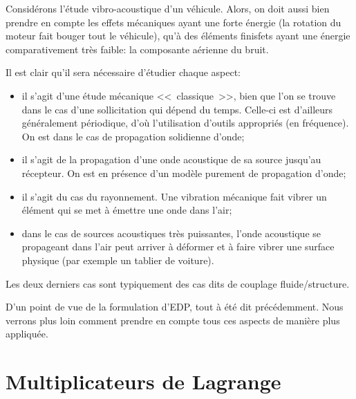 Considérons l'étude vibro-acoustique d'un véhicule.
Alors, on doit aussi bien prendre en compte les effets mécaniques ayant une forte
énergie (la rotation du moteur fait bouger tout le véhicule), qu'à des éléments finisfets ayant
une énergie comparativement très faible: la composante aérienne du bruit.

\medskip
Il est clair qu'il sera nécessaire d'étudier chaque aspect:
\begin{itemize}
\item {} il s'agit d'une étude mécanique <<~classique~>>, bien que l'on se trouve
	dans le cas d'une sollicitation qui dépend du temps. Celle-ci est d'ailleurs généralement
	périodique, d'où l'utilisation d'outils appropriés (en fréquence). On est dans
	le cas de propagation solidienne d'onde;
  \item {} il s'agit de la propagation d'une onde acoustique de sa source
	jusqu'au récepteur. On est en présence d'un modèle purement de propagation
	d'onde;
  \item {} il s'agit du cas du rayonnement. Une vibration mécanique fait
	vibrer un élément qui se met à émettre une onde dans l'air;
  \item {} dans le cas de sources acoustiques très puissantes, l'onde
	acoustique se propageant dans l'air peut arriver à déformer et à faire 
	vibrer une surface physique (par exemple un tablier de voiture).
\end{itemize}
Les deux derniers cas sont typiquement des cas dits de couplage fluide/structure.

\medskip
D'un point de vue de la formulation d'EDP, tout à été dit précédemment.
Nous verrons plus loin comment prendre en compte tous ces aspects de manière
plus appliquée.

\medskip
\section{Multiplicateurs de Lagrange}

